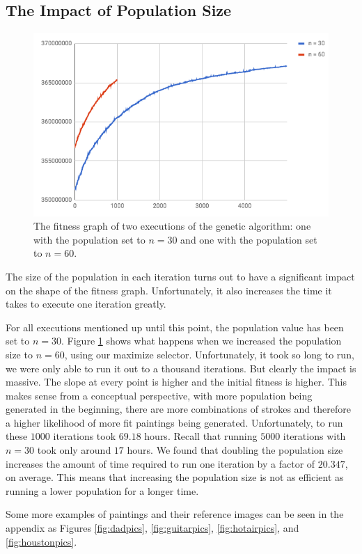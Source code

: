 \subsection{The Impact of Population Size}
\begin{figure}
    \centering
    \includegraphics[width=0.7\linewidth]{popsize.png}
    \caption[Fitness graph of different population levels]{The fitness graph of two executions of the genetic algorithm: one with the population set to $n = 30$ and one with the population set to $n = 60$.}
    \label{fig:popsize}
\end{figure}
The size of the population in each iteration turns out to have a significant impact on the shape of the fitness graph. Unfortunately, it also increases the time it takes to execute one iteration greatly. 

For all executions mentioned up until this point, the population value has been set to $n = 30$. Figure \ref{fig:popsize} shows what happens when we increased the population size to $n = 60$, using our maximize selector. Unfortunately, it took so long to run, we were only able to run it out to a thousand iterations. But clearly the impact is massive. The slope at every point is higher and the initial fitness is higher. This makes sense from a conceptual perspective, with more population being generated in the beginning, there are more combinations of strokes and therefore a higher likelihood of more fit paintings being generated. Unfortunately, to run these $1000$ iterations took $69.18$ hours. Recall that running $5000$ iterations with $n = 30$ took only around $17$ hours. We found that doubling the population size  increases the amount of time required to run one iteration by a factor of $20.347$, on average. This means that increasing the population size is not as efficient as running a lower population for a longer time.

Some more examples of paintings and their reference images can be seen in the appendix as Figures \ref{fig:dadpics}, \ref{fig:guitarpics}, \ref{fig:hotairpics},  and \ref{fig:houstonpics}.


